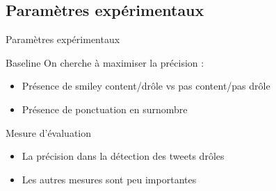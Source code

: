 \documentclass{beamer}
\begin{document}
\subsection{Paramètres expérimentaux}
\begin{frame}{Paramètres expérimentaux}
\begin{block}{Baseline}
On cherche à maximiser la précision :
\begin{itemize}
  \item Présence de smiley content/drôle vs pas content/pas drôle
  \item Présence de ponctuation en surnombre 
\end{itemize}
\end{block}


\begin{block}{Mesure d'évaluation}

\begin{itemize}
  \item La précision dans la détection des tweets drôles
  \item Les autres mesures sont peu importantes
\end{itemize}
\end{block}
\end{frame}
\end{document}
